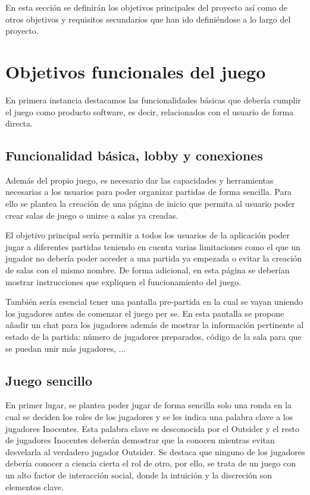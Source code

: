 En esta sección se definirán los objetivos principales del proyecto así como de otros objetivos y
requisitos secundarios que han ido definiéndose a lo largo del proyecto.

\section{Objetivos funcionales del juego} \label{Objetivos}

En primera instancia destacamos las funcionalidades básicas que debería cumplir el juego como
producto software, es decir, relacionados con el usuario de forma directa.

\subsection{Funcionalidad básica, lobby y conexiones}

Además del propio juego, es necesario dar las capacidades y herramientas necesarias a los usuarios para
poder organizar partidas de forma sencilla. Para ello se plantea la creación de una página de inicio que
permita al usuario poder crear salas de juego o unirse a salas ya creadas.

El objetivo principal sería permitir a todos los usuarios de la aplicación poder jugar a
diferentes partidas teniendo en cuenta varias limitaciones como el que un jugador no debería poder acceder
a una partida ya empezada o evitar la creación de salas con el mismo nombre. De forma adicional, en esta página se deberían mostrar instrucciones que expliquen el funcionamiento
del juego.

También sería esencial tener una pantalla pre-partida en la cual se vayan uniendo los jugadores
antes de comenzar el juego per se. En esta pantalla se propone añadir un chat para los jugadores además
de mostrar la información pertinente al estado de la partida: número de jugadores preparados, código de la
sala para que se puedan unir más jugadores, ...

\subsection{Juego sencillo}

En primer lugar, se plantea poder jugar de forma sencilla solo una ronda en la cual se deciden los
roles de los jugadores y se les indica una palabra clave a los jugadores Inocentes. Esta palabra 
clave es desconocida por el Outsider y el resto de jugadores Inocentes deberán demostrar 
que la conocen mientras evitan desvelarla al verdadero jugador Outsider. Se destaca 
que ninguno de los jugadores debería conocer a ciencia cierta el rol de otro, por ello, se trata de un juego 
con un alto factor de interacción social, donde la intuición y la discreción son elementos clave.

